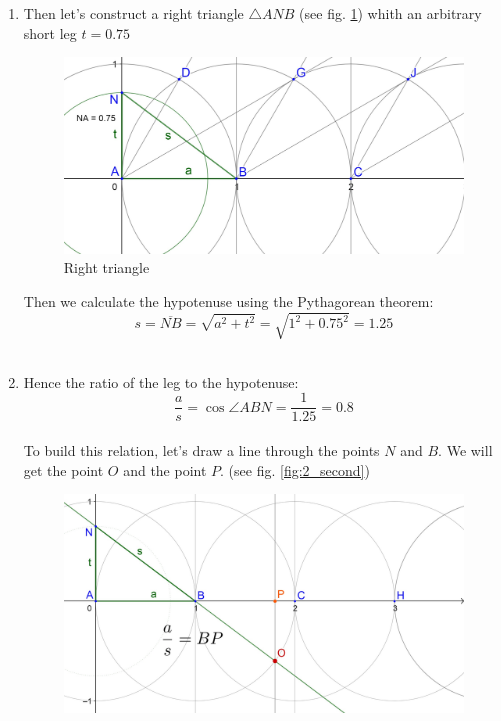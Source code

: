 \documentclass[12pt, letterpaper, oneside]{report}
\begin{document}
\begin{enumerate}
	\item Then let's construct a right triangle $\triangle ANB$ (see fig. \ref{fig:1_anb}) whith an arbitrary short leg $t=0.75$ \\
\begin{figure}[H]
	\centerline{\includegraphics[scale=0.18]{img/1_anb.jpg}}
	\caption{Right triangle}
	\label{fig:1_anb}
\end{figure}	
	Then we calculate the hypotenuse using the Pythagorean theorem:
\begin{equation}
s=\overline{NB}=\sqrt{a^{2}+t^{2}}=\sqrt{1^{2}+0.75^{2}}=1.25
\end{equation}
\\
	\item Hence the ratio of the leg to the hypotenuse:
\begin{equation}
	\dfrac{a}{s}=\cos \angle ABN=\dfrac{1}{1.25}=0.8
\end{equation}
\\
To build this relation, let's draw a line through the points $N$ and $B$. We will get the point $O$ and the point $P$. (see fig. \ref{fig:2_second})
\begin{figure}[h]
	\centerline{\includegraphics[scale=0.2]{img/anbo.jpg}}

\end{figure}
\end{enumerate}
\end{document}
